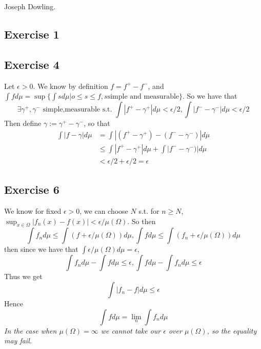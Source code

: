 \documentclass[a4paper, 12pt, twoside]{article}
\author{Joseph}
\begin{document}
Joseph Dowling.
\subsection*{Exercise 1}
\subsection*{Exercise 4}
Let $\epsilon>0$. We know by definition $f=f^{+}-f^{-}$, and $\int fd\mu=\sup\{\int sd\mu|o\leq s\leq f,s \text{simple and measurable}\}$. So we have that
$$\exists \gamma^{+},\gamma^{-} \text{ simple,measurable s.t. } \int|f^{+}-\gamma^{+}|d\mu<\epsilon/2, \int|f^{-}-\gamma^{-}|d\mu<\epsilon/2  $$
Then define $\gamma:=\gamma^{+}-\gamma^{-}$, so that
\begin{align*}
    \int|f-\gamma| d\mu&= \int|(f^{+}-\gamma^{+})-(f^{-}-\gamma^{-})|d\mu\\
    &\leq \int|f^{+}-\gamma^{+}|d\mu+\int|f^{-}-\gamma^{-})|d\mu\\
    & < \epsilon/2 + \epsilon/2 = \epsilon
\end{align*}
\subsection*{Exercise 6}
We know for fixed $\epsilon>0$, we can choose $N$ s.t. for $n\geq N$, $\sup_{x\in \Omega}|f_{n}(x)-f(x)|<\epsilon/\mu(\Omega)$. So then
$$\int f_{n}d\mu\leq \int(f+\epsilon/\mu(\Omega))d\mu, \int fd\mu\leq \int(f_{n}+\epsilon/\mu(\Omega))d\mu $$
then since we have that $\int\epsilon/\mu(\Omega)d\mu=\epsilon$,
$$\int f_{n}d\mu-\int fd\mu\leq \epsilon, \int fd\mu-\int f_{n}d\mu\leq \epsilon$$
Thus we get
$$ \int |f_{n}- f|d\mu\leq \epsilon$$
Hence
$$\int fd\mu=\lim_{n}\int f_{n}d\mu$$
\textit{In the case when $\mu(\Omega)=\infty$ we cannot take our $\epsilon$ over $\mu(\Omega)$, so the equality may fail.}
\end{document}
